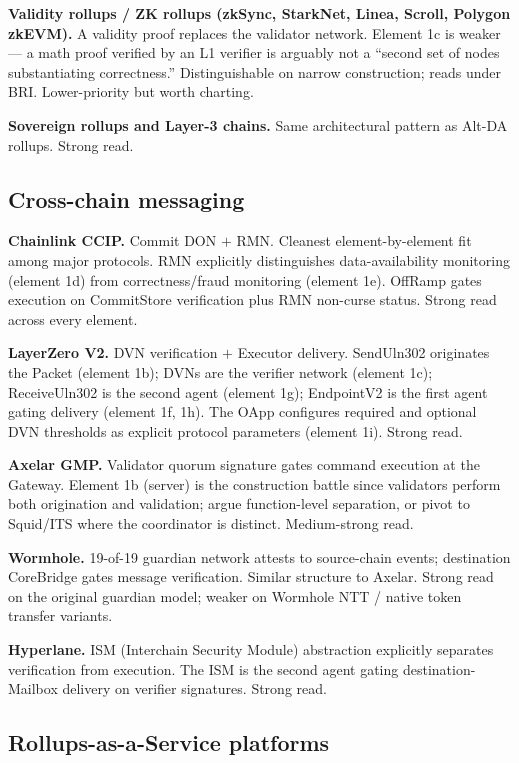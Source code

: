 \documentclass[11pt,letterpaper]{article}
\begin{document}
\textbf{Validity rollups / ZK rollups (zkSync, StarkNet, Linea, Scroll, Polygon zkEVM).} A validity proof replaces the validator network. Element 1c is weaker --- a math proof verified by an L1 verifier is arguably not a ``second set of nodes substantiating correctness.'' Distinguishable on narrow construction; reads under BRI. Lower-priority but worth charting.

\textbf{Sovereign rollups and Layer-3 chains.} Same architectural pattern as Alt-DA rollups. Strong read.

\subsection{Cross-chain messaging}

\textbf{Chainlink CCIP.} Commit DON $+$ RMN. Cleanest element-by-element fit among major protocols. RMN explicitly distinguishes data-availability monitoring (element 1d) from correctness/fraud monitoring (element 1e). OffRamp gates execution on CommitStore verification plus RMN non-curse status. Strong read across every element.

\textbf{LayerZero V2.} DVN verification $+$ Executor delivery. SendUln302 originates the Packet (element 1b); DVNs are the verifier network (element 1c); ReceiveUln302 is the second agent (element 1g); EndpointV2 is the first agent gating delivery (element 1f, 1h). The OApp configures required and optional DVN thresholds as explicit protocol parameters (element 1i). Strong read.

\textbf{Axelar GMP.} Validator quorum signature gates command execution at the Gateway. Element 1b (server) is the construction battle since validators perform both origination and validation; argue function-level separation, or pivot to Squid/ITS where the coordinator is distinct. Medium-strong read.

\textbf{Wormhole.} 19-of-19 guardian network attests to source-chain events; destination CoreBridge gates message verification. Similar structure to Axelar. Strong read on the original guardian model; weaker on Wormhole NTT / native token transfer variants.

\textbf{Hyperlane.} ISM (Interchain Security Module) abstraction explicitly separates verification from execution. The ISM is the second agent gating destination-Mailbox delivery on verifier signatures. Strong read.

\subsection{Rollups-as-a-Service platforms}
\end{document}
